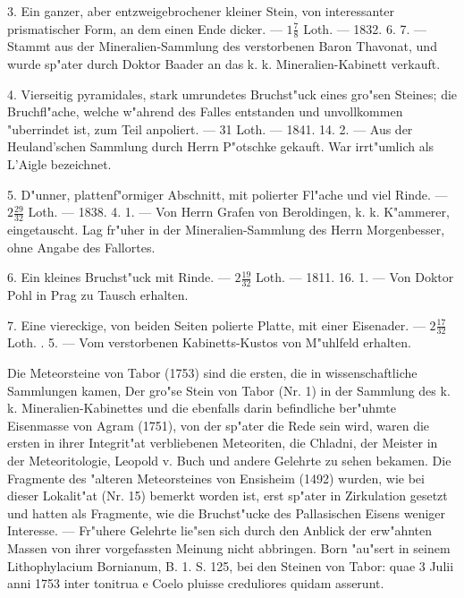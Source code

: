 \documentclass[a4paper, 11pt, oneside, polutonikogreek, german]{article}
\begin{document}
3. Ein ganzer, aber entzweigebrochener kleiner Stein, von interessanter prismatischer Form, an dem einen Ende dicker. --- $1\frac{7}{8}$ Loth. --- 1832. 6. 7. --- Stammt aus der Mineralien-Sammlung des verstorbenen Baron Thavonat, und wurde sp"ater durch Doktor Baader an das k. k. Mineralien-Kabinett verkauft.

4. Vierseitig pyramidales, stark umrundetes Bruchst"uck eines gro"sen Steines; die Bruchfl"ache, welche w"ahrend des Falles entstanden und unvollkommen "uberrindet ist, zum Teil anpoliert. --- 31 Loth. --- 1841. 14. 2. --- Aus der Heuland'schen Sammlung durch Herrn P"otschke gekauft. War irrt"umlich als L'Aigle bezeichnet.

5. D"unner, plattenf"ormiger Abschnitt, mit polierter Fl"ache und viel Rinde. --- $2\frac{29}{32}$ Loth. --- 1838. 4. 1. --- Von Herrn Grafen von Beroldingen, k. k. K"ammerer, eingetauscht. Lag fr"uher in der Mineralien-Sammlung des Herrn Morgenbesser, ohne Angabe des Fallortes.

6. Ein kleines Bruchst"uck mit Rinde. --- $2\frac{19}{32}$ Loth. --- 1811. 16. 1. --- Von Doktor Pohl in Prag zu Tausch erhalten.

7. Eine viereckige, von beiden Seiten polierte Platte, mit einer Eisenader. --- $2\frac{17}{32}$ Loth. . 5. --- Vom verstorbenen Kabinetts-Kustos von M"uhlfeld erhalten.

\setlength{\leftskip}{10mm}
\setlength{\parindent}{0pt}

{\footnotesize Die Meteorsteine von Tabor (1753) sind die ersten, die in wissenschaftliche Sammlungen kamen, Der gro"se Stein von Tabor (Nr. 1) in der Sammlung des k. k. Mineralien-Kabinettes und die ebenfalls darin befindliche ber"uhmte Eisenmasse von Agram (1751), von der sp"ater die Rede sein wird, waren die ersten in ihrer Integrit"at verbliebenen Meteoriten, die Chladni, der Meister in der Meteoritologie, Leopold v. Buch und andere Gelehrte zu sehen bekamen. Die Fragmente des "alteren Meteorsteines von Ensisheim (1492) wurden, wie bei dieser Lokalit"at (Nr. 15) bemerkt worden ist, erst sp"ater in Zirkulation gesetzt und hatten als Fragmente, wie die Bruchst"ucke des Pallasischen Eisens weniger Interesse. --- Fr"uhere Gelehrte lie"sen sich durch den Anblick der erw"ahnten Massen von ihrer vorgefassten Meinung nicht abbringen. Born "au"sert in seinem Lithophylacium Bornianum, B. 1. S. 125, bei den Steinen von Tabor: quae 3 Julii anni 1753 inter tonitrua e Coelo pluisse creduliores quidam asserunt.}

\setlength{\leftskip}{0pt}
\setlength{\parindent}{20pt}
\end{document}
